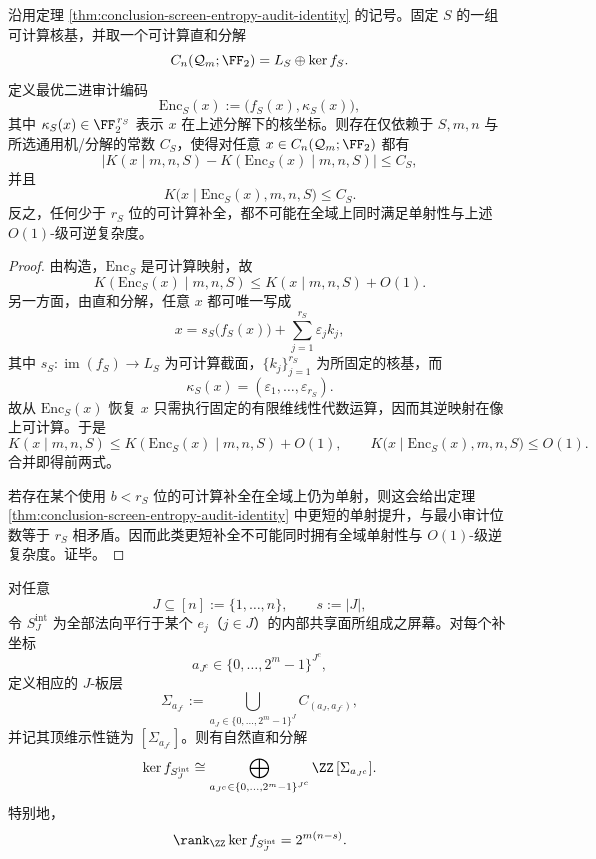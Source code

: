 \begin{theorem}\label{thm:conclusion-screen-optimal-audit-kolmogorov-isometry}
沿用定理 \ref{thm:conclusion-screen-entropy-audit-identity} 的记号。固定 \(S\) 的一组可计算核基，并取一个可计算直和分解
\[
C_n(\mathcal Q_m;\FF_2)=L_S\oplus \ker f_S.
\]
定义最优二进审计编码
\[
\mathrm{Enc}_S(x):=\bigl(f_S(x),\kappa_S(x)\bigr),
\]
其中 \(\kappa_S(x)\in \FF_2^{\,r_S}\) 表示 \(x\) 在上述分解下的核坐标。则存在仅依赖于 \(S,m,n\) 与所选通用机/分解的常数 \(C_S\)，使得对任意 \(x\in C_n(\mathcal Q_m;\FF_2)\) 都有
\[
\bigl|K(x\mid m,n,S)-K(\mathrm{Enc}_S(x)\mid m,n,S)\bigr|\le C_S,
\]
并且
\[
K\bigl(x\mid \mathrm{Enc}_S(x),m,n,S\bigr)\le C_S.
\]
反之，任何少于 \(r_S\) 位的可计算补全，都不可能在全域上同时满足单射性与上述 \(O(1)\)-级可逆复杂度。
\end{theorem}

\begin{proof}
由构造，\(\mathrm{Enc}_S\) 是可计算映射，故
\[
K(\mathrm{Enc}_S(x)\mid m,n,S)\le K(x\mid m,n,S)+O(1).
\]
另一方面，由直和分解，任意 \(x\) 都可唯一写成
\[
x=s_S\bigl(f_S(x)\bigr)+\sum_{j=1}^{r_S}\varepsilon_j k_j,
\]
其中 \(s_S:\operatorname{im}(f_S)\to L_S\) 为可计算截面，\(\{k_j\}_{j=1}^{r_S}\) 为所固定的核基，而
\[
\kappa_S(x)=(\varepsilon_1,\dots,\varepsilon_{r_S}).
\]
故从 \(\mathrm{Enc}_S(x)\) 恢复 \(x\) 只需执行固定的有限维线性代数运算，因而其逆映射在像上可计算。于是
\[
K(x\mid m,n,S)\le K(\mathrm{Enc}_S(x)\mid m,n,S)+O(1),
\qquad
K\bigl(x\mid \mathrm{Enc}_S(x),m,n,S\bigr)\le O(1).
\]
合并即得前两式。

若存在某个使用 \(b<r_S\) 位的可计算补全在全域上仍为单射，则这会给出定理 \ref{thm:conclusion-screen-entropy-audit-identity} 中更短的单射提升，与最小审计位数等于 \(r_S\) 相矛盾。因而此类更短补全不可能同时拥有全域单射性与 \(O(1)\)-级逆复杂度。证毕。
\end{proof}

\begin{theorem}[内部坐标束屏幕核的板层分解]\label{thm:conclusion-coordinate-bundle-kernel-slab-decomposition}
对任意
\[
J\subseteq [n]:=\{1,\dots,n\},
\qquad
s:=|J|,
\]
令 \(S_J^{\mathrm{int}}\) 为全部法向平行于某个 \(e_j\)（\(j\in J\)）的内部共享面所组成之屏幕。对每个补坐标
\[
a_{J^c}\in\{0,\dots,2^m-1\}^{J^c},
\]
定义相应的 \(J\)-板层
\[
\Sigma_{a_{J^c}}
:=
\bigcup_{a_J\in \{0,\dots,2^m-1\}^{J}} C_{(a_J,a_{J^c})},
\]
并记其顶维示性链为 \([\Sigma_{a_{J^c}}]\)。则有自然直和分解
\[
\ker f_{S_J^{\mathrm{int}}}
\cong
\bigoplus_{a_{J^c}\in \{0,\dots,2^m-1\}^{J^c}}
\ZZ\,[\Sigma_{a_{J^c}}].
\]
特别地，
\[
\rank_{\ZZ}\ker f_{S_J^{\mathrm{int}}}=2^{m(n-s)}.
\]
\end{theorem}

